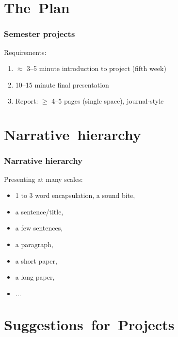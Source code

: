 

\section{The\ Plan}

\begin{frame}
  \frametitle{Semester projects}


  \begin{block}{Requirements:}
    \begin{enumerate}
    \item<1-> $\approx$ 3--5 minute introduction to project (fifth week)
    \item<2-> 10--15 minute final presentation
    \item<3-> Report: $\ge$ 4--5 pages (single space), journal-style
    \end{enumerate}
  \end{block}

\end{frame}

\section{Narrative\ hierarchy}

\begin{frame}
  \frametitle{Narrative hierarchy}

  \begin{block}{Presenting at many scales:}
    \begin{itemize}
    \item 
      1 to 3 word encapsulation, a sound bite,
    \item 
      a sentence/title,
    \item 
      a few sentences,
    \item 
      a paragraph,
    \item 
      a short paper,
    \item 
      a long paper,
    \item 
      $\ldots$
    \end{itemize}
  \end{block}

\end{frame}

\section{Suggestions\ for\ Projects}


